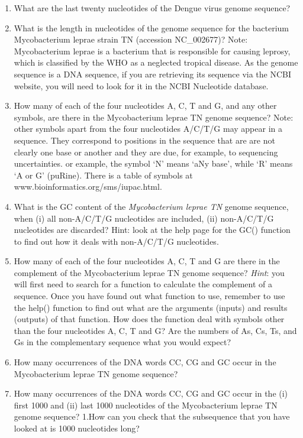 \documentclass[
]{book}
\providecommand{\tightlist}{%
  \setlength{\itemsep}{0pt}\setlength{\parskip}{0pt}}
\begin{document}
\begin{enumerate}
\def\labelenumi{\arabic{enumi}.}
\tightlist
\item
  What are the last twenty nucleotides of the Dengue virus genome sequence?
\item
  What is the length in nucleotides of the genome sequence for the bacterium Mycobacterium leprae strain TN (accession NC\_002677)?
  Note: Mycobacterium leprae is a bacterium that is responsible for causing leprosy, which is classified by the WHO as a neglected tropical disease. As the genome sequence is a DNA sequence, if you are retrieving its sequence via the NCBI website, you will need to look for it in the NCBI Nucleotide database.
\item
  How many of each of the four nucleotides A, C, T and G, and any other symbols, are there in the Mycobacterium leprae TN genome sequence?
  Note: other symbols apart from the four nucleotides A/C/T/G may appear in a sequence. They correspond to positions in the sequence that are are not clearly one base or another and they are due, for example, to sequencing uncertainties. or example, the symbol `N' means `aNy base', while `R' means `A or G' (puRine). There is a table of symbols at www.bioinformatics.org/sms/iupac.html.
\item
  What is the GC content of the \emph{Mycobacterium leprae TN} genome sequence, when (i) all non-A/C/T/G nucleotides are included, (ii) non-A/C/T/G nucleotides are discarded?
  Hint: look at the help page for the GC() function to find out how it deals with non-A/C/T/G nucleotides.
\item
  How many of each of the four nucleotides A, C, T and G are there in the complement of the Mycobacterium leprae TN genome sequence? \emph{Hint}: you will first need to search for a function to calculate the complement of a sequence. Once you have found out what function to use, remember to use the help() function to find out what are the arguments (inputs) and results (outputs) of that function. How does the function deal with symbols other than the four nucleotides A, C, T and G? Are the numbers of As, Cs, Ts, and Gs in the complementary sequence what you would expect?
\item
  How many occurrences of the DNA words CC, CG and GC occur in the Mycobacterium leprae TN genome sequence?
\item
  How many occurrences of the DNA words CC, CG and GC occur in the (i) first 1000 and (ii) last 1000 nucleotides of the Mycobacterium leprae TN genome sequence?
  1.How can you check that the subsequence that you have looked at is 1000 nucleotides long?
\end{enumerate}
\end{document}
